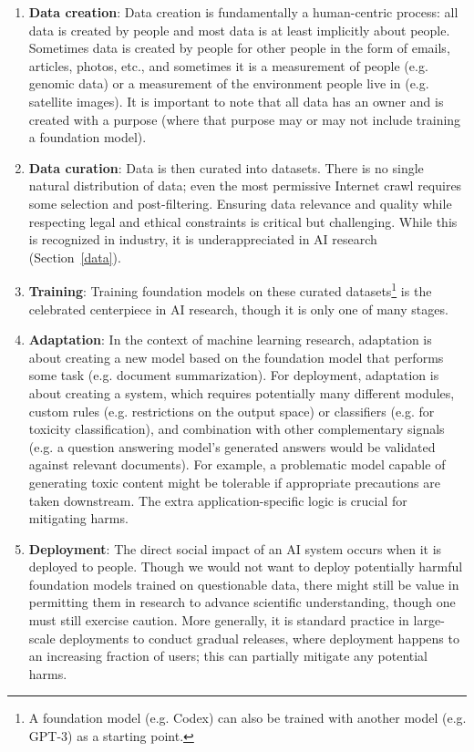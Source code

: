 \begin{enumerate}
  \item \textbf{Data creation}: Data creation is fundamentally a human-centric process: all data is created by people and most data is at least implicitly about people. Sometimes data is created by people for other people in the form of emails, articles, photos, etc., and sometimes it is a measurement of people (e.g. genomic data) or a measurement of the environment people live in (e.g. satellite images). It is important to note that all data has an owner and is created with a purpose (where that purpose may or may not include training a foundation model).

  \item \textbf{Data curation}: Data is then curated into datasets. There is no single natural distribution of data; even the most permissive Internet crawl requires some selection and post-filtering. Ensuring data relevance and quality while respecting legal and ethical constraints is critical but challenging. While this is recognized in industry, it is underappreciated in AI research (Section~\ref{data}).

  \item \textbf{Training}:
    Training foundation models on these curated datasets\footnote{A foundation model (e.g. Codex) can also be trained with another model (e.g. GPT-3) as a starting point.} is the celebrated centerpiece in AI research, though it is only one of many stages.

  \item \textbf{Adaptation}:
    In the context of machine learning research, adaptation is about creating a new model based on the foundation model that performs some task (e.g. document summarization). For deployment, adaptation is about creating a system, which requires potentially many different modules, custom rules (e.g. restrictions on the output space) or classifiers (e.g. for toxicity classification), and combination with other complementary signals (e.g. a question answering model's generated answers would be validated against relevant documents). For example, a problematic model capable of generating toxic content might be tolerable if appropriate precautions are taken downstream. The extra application-specific logic is crucial for mitigating harms.

  \item \textbf{Deployment}:
    The direct social impact of an AI system occurs when it is deployed to people. Though we would not want to deploy potentially harmful foundation models trained on questionable data, there might still be value in permitting them in research to advance scientific understanding, though one must still exercise caution. More generally, it is standard practice in large-scale deployments to conduct gradual releases, where deployment happens to an increasing fraction of users; this can partially mitigate any potential harms.
\end{enumerate}

